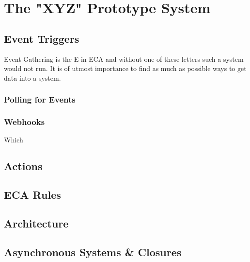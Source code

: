 
\chapter{The "XYZ" Prototype System}

%



\section{Event Triggers}

Event Gathering is the E in ECA and without one of these letters such a system would not run.
It is of utmost importance to find as much as possible ways to get data into a system.



\subsection{Polling for Events}



\subsection{Webhooks}
Which 



\section{Actions}



\section{ECA Rules}



\section{Architecture}



\section{Asynchronous Systems \& Closures}
%


